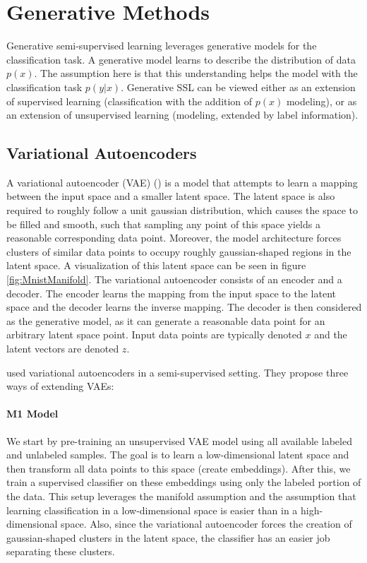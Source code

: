 \section{Generative Methods}
\label{sec:GenerativeSslMethods}

Generative semi-supervised learning leverages generative models for the classification task. A generative model learns to describe the distribution of data $p(x)$. The assumption here is that this understanding helps the model with the classification task $p(y|x)$. Generative SSL can be viewed either as an extension of supervised learning (classification with the addition of $p(x)$ modeling), or as an extension of unsupervised learning (modeling, extended by label information).


\subsection{Variational Autoencoders}

A variational autoencoder (VAE) (\cite{VariationalAutoencoder}) is a model that attempts to learn a mapping between the input space and a smaller latent space. The latent space is also required to roughly follow a unit gaussian distribution, which causes the space to be filled and smooth, such that sampling any point of this space yields a reasonable corresponding data point. Moreover, the model architecture forces clusters of similar data points to occupy roughly gaussian-shaped regions in the latent space. A visualization of this latent space can be seen in figure \ref{fig:MnistManifold}. The variational autoencoder consists of an encoder and a decoder. The encoder learns the mapping from the input space to the latent space and the decoder learns the inverse mapping. The decoder is then considered as the generative model, as it can generate a reasonable data point for an arbitrary latent space point. Input data points are typically denoted $x$ and the latent vectors are denoted $z$.

\cite{KingmaSslVae} used variational autoencoders in a semi-supervised setting. They propose three ways of extending VAEs:

\paragraph*{M1 Model}
We start by pre-training an unsupervised VAE model using all available labeled and unlabeled samples. The goal is to learn a low-dimensional latent space and then transform all data points to this space (create embeddings). After this, we train a supervised classifier on these embeddings using only the labeled portion of the data. This setup leverages the manifold assumption and the assumption that learning classification in a low-dimensional space is easier than in a high-dimensional space. Also, since the variational autoencoder forces the creation of gaussian-shaped clusters in the latent space, the classifier has an easier job separating these clusters.

